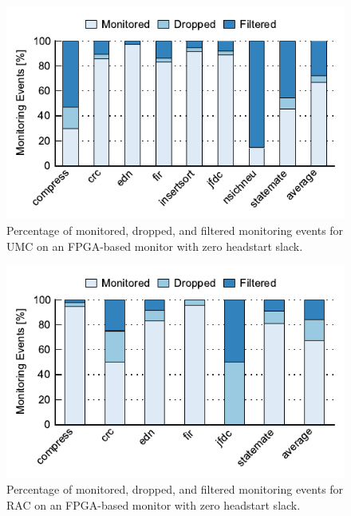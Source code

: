 \begin{figure}
  \begin{center}
    \includegraphics{monitoring_hard_drop/data/zero_slack_flex_umc.pdf}
    \caption{Percentage of monitored, dropped, and filtered monitoring events
    for UMC on an FPGA-based monitor with zero headstart slack.}
    \label{fig:monitoring_hard_drop.evaluation.zero_slack_flex_umc}
  \end{center}
\end{figure}
\begin{figure}
  \begin{center}
    \includegraphics{monitoring_hard_drop/data/zero_slack_flex_lrc.pdf}
    \caption{Percentage of monitored, dropped, and filtered monitoring events
    for RAC on an FPGA-based monitor with zero headstart slack.}
    \label{fig:monitoring_hard_drop.evaluation.zero_slack_flex_lrc}
  \end{center}
\end{figure}
